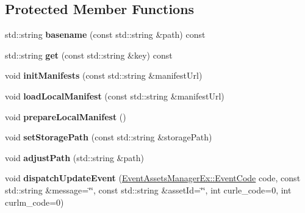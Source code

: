\subsection*{Protected Member Functions}
\begin{DoxyCompactItemize}
\item 
\mbox{\label{classAssetsManagerEx_ac8225cdfddff06576a2feee23acee2a0}} 
std\+::string {\bfseries basename} (const std\+::string \&path) const
\item 
\mbox{\label{classAssetsManagerEx_a00963ee3a1b97fe9db6c173195374726}} 
std\+::string {\bfseries get} (const std\+::string \&key) const
\item 
\mbox{\label{classAssetsManagerEx_acbddf0f0953d7edbd02774972bd409d2}} 
void {\bfseries init\+Manifests} (const std\+::string \&manifest\+Url)
\item 
\mbox{\label{classAssetsManagerEx_aa6f0e8cd27fbf4ba6212abd2a2c05c63}} 
void {\bfseries load\+Local\+Manifest} (const std\+::string \&manifest\+Url)
\item 
\mbox{\label{classAssetsManagerEx_a90058fdf24cf850439262ededaa0a521}} 
void {\bfseries prepare\+Local\+Manifest} ()
\item 
\mbox{\label{classAssetsManagerEx_a67700d2545ce476e3f3fa2f7e9bd5249}} 
void {\bfseries set\+Storage\+Path} (const std\+::string \&storage\+Path)
\item 
\mbox{\label{classAssetsManagerEx_a194bb3bc7dfec8cfada45a01dd3787be}} 
void {\bfseries adjust\+Path} (std\+::string \&path)
\item 
\mbox{\label{classAssetsManagerEx_abbad5dab755a0c53f46bc59bdeddc72a}} 
void {\bfseries dispatch\+Update\+Event} (\hyperlink{classEventAssetsManagerEx_ae48992cd906169f84a146e7ae8851cae}{Event\+Assets\+Manager\+Ex\+::\+Event\+Code} code, const std\+::string \&message=\char`\"{}\char`\"{}, const std\+::string \&asset\+Id=\char`\"{}\char`\"{}, int curle\+\_\+code=0, int curlm\+\_\+code=0)
\item 
\mbox{\label{classAssetsManagerEx_aa692723272d965b05bd60729856279fe}} 

\end{DoxyCompactItemize}
